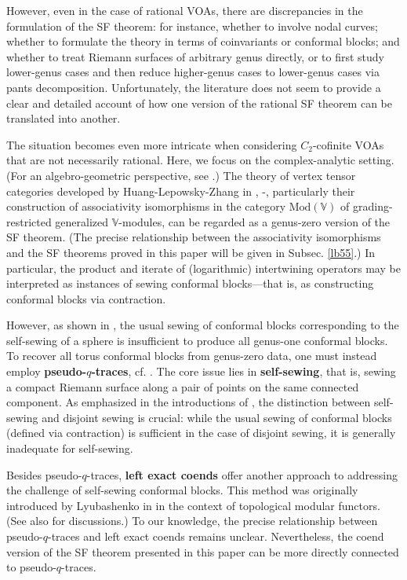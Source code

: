 \documentclass[11pt,b5paper,notitlepage]{article}
\theoremstyle{definition}
\theoremstyle{plain}
\newcommand{\Vbb}{\mathbb V}
\newcommand{\<}{\left\langle}
\renewcommand{\>}{\right\rangle}
\newcommand{\Mod}{\mathrm{Mod}}
\numberwithin{equation}{section}
\begin{document}
However, even in the case of rational VOAs, there are discrepancies in the formulation of the SF theorem: for instance, whether to involve nodal curves; whether to formulate the theory in terms of coinvariants or conformal blocks; and whether to treat Riemann surfaces of arbitrary genus directly, or to first study lower-genus cases and then reduce higher-genus cases to lower-genus cases via pants decomposition. Unfortunately, the literature does not seem to provide a clear and detailed account of how one version of the rational SF theorem can be translated into another.

The situation becomes even more intricate when considering $C_2$-cofinite VOAs that are not necessarily rational. Here, we focus on the complex-analytic setting. (For an algebro-geometric perspective, see \cite{DGK-presentations, DGK2}.) The theory of vertex tensor categories developed by Huang-Lepowsky-Zhang in \cite{HLZ1}, \cite{HLZ2}-\cite{HLZ8}, particularly their construction of associativity isomorphisms in the category $\Mod(\Vbb)$ of grading-restricted generalized $\Vbb$-modules, can be regarded as a genus-zero version of the SF theorem. (The precise relationship between the associativity isomorphisms and the SF theorems proved in this paper will be given in Subsec. \ref{lb55}.) In particular, the product and iterate of (logarithmic) intertwining operators may be interpreted as instances of sewing conformal blocks—that is, as constructing conformal blocks via contraction.


However, as shown in \cite{Miy-modular-invariance}, the usual sewing of conformal blocks corresponding to the self-sewing of a sphere is insufficient to produce all genus-one conformal blocks. To recover all torus conformal blocks from genus-zero data, one must instead employ \textbf{pseudo-$q$-traces}, cf. \cite{Miy-modular-invariance,AN-pseudo-trace,Hua-modular-C2}. The core issue lies in \textbf{self-sewing}, that is, sewing a compact Riemann surface along a pair of points on the same connected component. As emphasized in the introductions of \cite{GZ1, GZ2}, the distinction between self-sewing and disjoint sewing is crucial: while the usual sewing of conformal blocks (defined via contraction) is sufficient in the case of disjoint sewing, it is generally inadequate for self-sewing. 

Besides pseudo-$q$-traces, \textbf{left exact coends} offer another approach to addressing the challenge of self-sewing conformal blocks. This method was originally introduced by Lyubashenko in \cite{Lyu96-Ribbon} in the context of topological modular functors. (See also \cite{FS-coends-CFT, HR24-MF} for discussions.) To our knowledge, the precise relationship between pseudo-$q$-traces and left exact coends remains unclear. Nevertheless, the coend version of the SF theorem presented in this paper can be more directly connected to pseudo-$q$-traces. 
\end{document}
